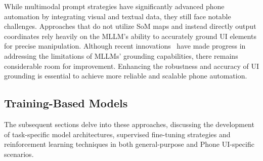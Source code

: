 While multimodal prompt strategies have significantly advanced phone automation by integrating visual and textual data, they still face notable challenges. Approaches that do not utilize SoM maps and instead directly output coordinates rely heavily on the MLLM's ability to accurately ground UI elements for precise manipulation. Although recent innovations~\cite{wang2024mobileagentv2,zhang2024mobileexperts,liu2024vision} have made progress in addressing the limitations of MLLMs' grounding capabilities, there remains considerable room for improvement. Enhancing the robustness and accuracy of UI grounding is essential to achieve more reliable and scalable phone automation.


\subsection{Training-Based Models}
\label{subsec:training_based}

The subsequent sections delve into these approaches, discussing the development of task-specific model architectures, supervised fine-tuning strategies and reinforcement learning techniques in both general-purpose and Phone UI-specific scenarios.

